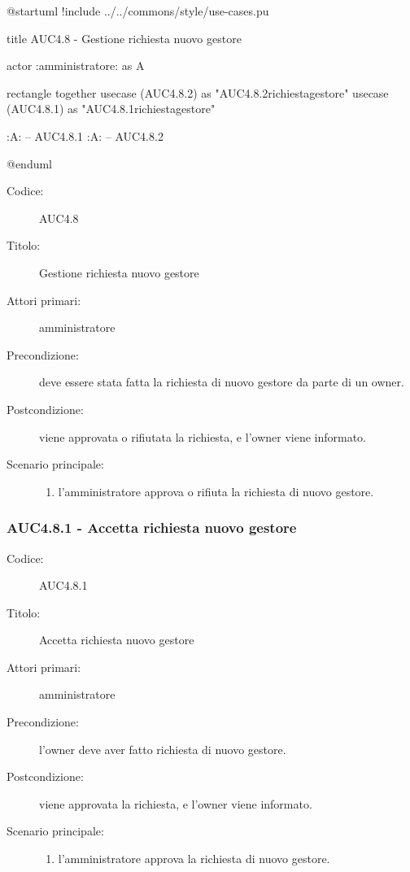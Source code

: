 \documentclass[casi-duso]{subfiles}
\begin{document}
\begin{plantuml}
@startuml
!include ../../commons/style/use-cases.pu

title AUC4.8 - Gestione richiesta nuovo gestore

actor :amministratore: as A

rectangle {
  together {
    usecase (AUC4.8.2) as "AUC4.8.2\nRifiuta richiesta\nnuovo gestore"
    usecase (AUC4.8.1) as "AUC4.8.1\nAccetta richiesta\nnuovo gestore"
  }
}

:A: -- AUC4.8.1
:A: -- AUC4.8.2

@enduml
\end{plantuml}

\begin{description}
  \item[Codice:] AUC4.8
  \item[Titolo:] Gestione richiesta nuovo gestore
  \item[Attori primari:] amministratore
  \item[Precondizione:] deve essere stata fatta la richiesta di nuovo gestore da parte di un owner.
  \item[Postcondizione:] viene approvata o rifiutata la richiesta, e l'owner viene informato.
  \item[Scenario principale:]
  \begin{enumerate}
    \item l'amministratore approva o rifiuta la richiesta di nuovo gestore.
  \end{enumerate}
\end{description}

\subsubsection{AUC4.8.1 - Accetta richiesta nuovo gestore}%
\label{subsub:AUC4.8.1}
\begin{description}
  \item[Codice:] AUC4.8.1
  \item[Titolo:] Accetta richiesta nuovo gestore
  \item[Attori primari:] amministratore
  \item[Precondizione:] l'owner deve aver fatto richiesta di nuovo gestore.
  \item[Postcondizione:] viene approvata la richiesta, e l'owner viene informato.
  \item[Scenario principale:]
  \begin{enumerate}
    \item l'amministratore approva la richiesta di nuovo gestore.
  \end{enumerate}
\end{description}  
\end{document}
